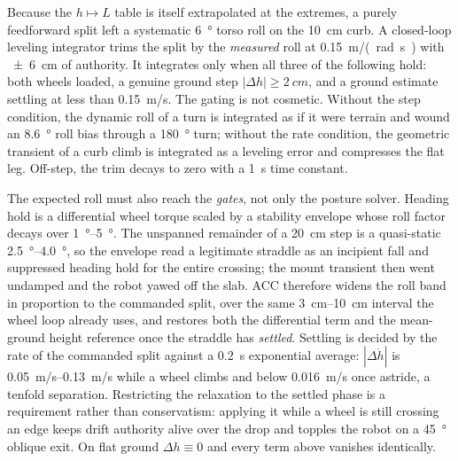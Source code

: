 \documentclass[conference]{IEEEtran}
\begin{document}
Because the $h \mapsto L$ table is itself extrapolated at the extremes, a
purely feedforward split left a systematic \SI{+6}{\degree} torso roll on the
\SI{10}{cm} curb. A closed-loop leveling integrator trims the split by the
\emph{measured} roll at \SI{0.15}{m/(rad.s)} with \SI{\pm 6}{cm} of authority.
It integrates only when all three of the following hold: both wheels loaded, a
genuine ground step $|\Delta h| \geq \SI{2}{cm}$, and a ground estimate settling
at less than \SI{0.15}{m/s}. The gating is not cosmetic. Without the step
condition, the dynamic roll of a turn is integrated as if it were terrain and
wound an \SI{8.6}{\degree} roll bias through a \SI{180}{\degree} turn; without
the rate condition, the geometric transient of a curb climb is integrated as a
leveling error and compresses the flat leg. Off-step, the trim decays to zero
with a \SI{1}{s} time constant.

The expected roll must also reach the \emph{gates}, not only the posture solver.
Heading hold is a differential wheel torque scaled by a stability envelope whose
roll factor decays over \SIrange{1}{5}{\degree}. The unspanned remainder of a
\SI{20}{cm} step is a quasi-static \SIrange{2.5}{4.0}{\degree}, so the envelope
read a legitimate straddle as an incipient fall and suppressed heading hold for the entire crossing; the mount transient then went undamped and the robot yawed
off the slab. ACC therefore widens the roll band in proportion to the commanded
split, over the same \SIrange{3}{10}{cm} interval the wheel loop already uses,
and restores both the differential term and the mean-ground height reference once
the straddle has \emph{settled}. Settling is decided by the rate of the commanded
split against a \SI{0.2}{s} exponential average: $|\Delta \dot h|$ is
\SIrange{0.05}{0.13}{m/s} while a wheel climbs and below \SI{0.016}{m/s} once
astride, a tenfold separation. Restricting the relaxation to the settled phase is
a requirement rather than conservatism: applying it while a wheel is still
crossing an edge keeps drift authority alive over the drop and topples the robot
on a \SI{45}{\degree} oblique exit. On flat ground $\Delta h \equiv 0$ and every
term above vanishes identically.
\end{document}
